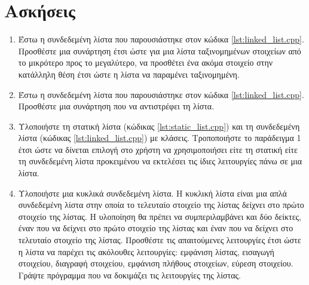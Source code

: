 \section{Ασκήσεις}
\begin{enumerate}
\item Έστω η συνδεδεμένη λίστα που παρουσιάστηκε στον κώδικα \ref{lst:linked_list.cpp}. Προσθέστε μια συνάρτηση έτσι ώστε για  μια λίστα ταξινομημένων στοιχείων από το μικρότερο προς το μεγαλύτερο, να προσθέτει ένα ακόμα στοιχείο στην κατάλληλη θέση έτσι ώστε η λίστα να παραμένει ταξινομημένη.
\item Έστω η συνδεδεμένη λίστα που παρουσιάστηκε στον κώδικα \ref{lst:linked_list.cpp}. Προσθέστε μια συνάρτηση που να αντιστρέφει τη λίστα.
\item Υλοποιήστε τη στατική λίστα (κώδικας \ref{lst:static_list.cpp}) και τη συνδεδεμένη λίστα (κώδικας \ref{lst:linked_list.cpp}) με κλάσεις. Τροποποιήστε το παράδειγμα 1 έτσι ώστε να δίνεται επιλογή στο χρήστη να χρησιμοποιήσει είτε τη στατική είτε τη συνδεδεμένη λίστα προκειμένου να εκτελέσει τις ίδιες λειτουργίες πάνω σε μια λίστα. 
\item Υλοποιήστε μια κυκλικά συνδεδεμένη λίστα. Η κυκλική λίστα είναι μια απλά συνδεδεμένη λίστα στην οποία το τελευταίο στοιχείο της λίστας δείχνει στο πρώτο στοιχείο της λίστας. Η υλοποίηση θα πρέπει να συμπεριλαμβάνει και δύο δείκτες, έναν που να δείχνει στο πρώτο στοιχείο της λίστας και έναν που να δείχνει στο τελευταίο στοιχείο της λίστας. Προσθέστε τις απαιτούμενες λειτουργίες έτσι ώστε η λίστα να παρέχει τις ακόλουθες λειτουργίες: εμφάνιση λίστας, εισαγωγή στοιχείου, διαγραφή στοιχείου, εμφάνιση πλήθους στοιχείων, εύρεση στοιχείου. Γράψτε πρόγραμμα που να δοκιμάζει τις λειτουργίες της λίστας.
\end{enumerate}


